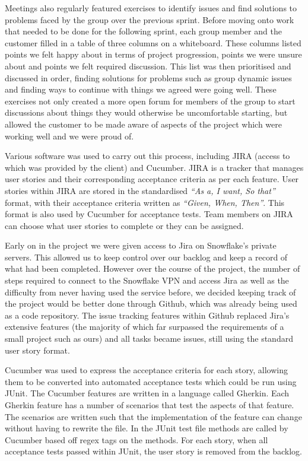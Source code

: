 \documentclass[a4paper, 12pt]{article}
\begin{document}
Meetings also regularly featured exercises to identify issues and find solutions to problems faced by the group over the previous sprint. Before moving onto work that needed to be done for the following sprint, each group member and the customer filled in a table of three columns on a whiteboard. These columns listed points we felt happy about in terms of project progression, points we were unsure about and points we felt required discussion. This list was then prioritised and discussed in order, finding solutions for problems such as group dynamic issues and finding ways to continue with things we agreed were going well. These exercises not only created a more open forum for members of the group to start discussions about things they would otherwise be uncomfortable starting, but allowed the customer to be made aware of aspects of the project which were working well and we were proud of.

Various software was used to carry out this process, including JIRA (access to which was provided by the client) and Cucumber. JIRA is a tracker that manages user stories and their corresponding acceptance criteria as per each feature. User stories within JIRA are stored in the standardised \emph{``As a, I want, So that''} format, with their acceptance criteria written as \emph{``Given, When, Then''}. This format is also used by Cucumber for acceptance tests. Team members on JIRA can choose what user stories to complete or they can be assigned.

Early on in the project we were given access to Jira on Snowflake's private servers. This allowed us to keep control over our backlog and keep a record of what had been completed. However over the course of the project, the number of steps required to connect to the Snowflake VPN and access Jira as well as the difficulty from never having used the service before, we decided keeping track of the project would be better done through Github, which was already being used as a code repository. The issue tracking features within Github replaced Jira's extensive features (the majority of which far surpassed the requirements of a small project such as ours) and all tasks became issues, still using the standard user story format.

Cucumber was used to express the acceptance criteria for each story, allowing them to be converted into automated acceptance tests which could be run using JUnit. The Cucumber features are written in a language called Gherkin. Each Gherkin feature has a number of scenarios that test the aspects of that feature. The scenarios are written such that the implementation of the feature can change without having to rewrite the file. In the JUnit test file methods are called by Cucumber based off regex tags on the methods. For each story, when all acceptance tests passed within JUnit, the user story is removed from the backlog.
\end{document}

